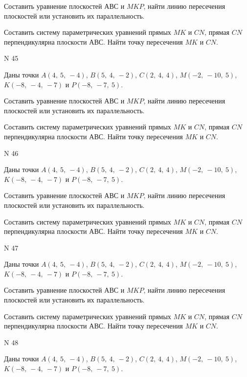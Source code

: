 \documentclass[11pt]{report}
\begin{document}
Составить уравнение плоскостей $АВС$ и $MKP$,
найти линию пересечения плоскостей или установить их параллельность.

Составить систему параметрических уравнений прямых $MK$ и $CN$,
прямая $CN$ перпендикулярна плоскости $АВС$. 
Найти точку пересечения $MK$ и $CN$.



 N 45

Даны точки $A\left( 4, \  5, \  -4\right)$, $B\left( 5, \  4, \  -2\right)$, $C\left( 2, \  4, \  4\right)$, $M\left( -2, \  -10, \  5\right)$, $K\left( -8, \  -4, \  -7\right)$ и $P\left( -8, \  -7, \  5\right)$.


Составить уравнение плоскостей $АВС$ и $MKP$,
найти линию пересечения плоскостей или установить их параллельность.

Составить систему параметрических уравнений прямых $MK$ и $CN$,
прямая $CN$ перпендикулярна плоскости $АВС$. 
Найти точку пересечения $MK$ и $CN$.



 N 46

Даны точки $A\left( 4, \  5, \  -4\right)$, $B\left( 5, \  4, \  -2\right)$, $C\left( 2, \  4, \  4\right)$, $M\left( -2, \  -10, \  5\right)$, $K\left( -8, \  -4, \  -7\right)$ и $P\left( -8, \  -7, \  5\right)$.


Составить уравнение плоскостей $АВС$ и $MKP$,
найти линию пересечения плоскостей или установить их параллельность.

Составить систему параметрических уравнений прямых $MK$ и $CN$,
прямая $CN$ перпендикулярна плоскости $АВС$. 
Найти точку пересечения $MK$ и $CN$.



 N 47

Даны точки $A\left( 4, \  5, \  -4\right)$, $B\left( 5, \  4, \  -2\right)$, $C\left( 2, \  4, \  4\right)$, $M\left( -2, \  -10, \  5\right)$, $K\left( -8, \  -4, \  -7\right)$ и $P\left( -8, \  -7, \  5\right)$.


Составить уравнение плоскостей $АВС$ и $MKP$,
найти линию пересечения плоскостей или установить их параллельность.

Составить систему параметрических уравнений прямых $MK$ и $CN$,
прямая $CN$ перпендикулярна плоскости $АВС$. 
Найти точку пересечения $MK$ и $CN$.



 N 48

Даны точки $A\left( 4, \  5, \  -4\right)$, $B\left( 5, \  4, \  -2\right)$, $C\left( 2, \  4, \  4\right)$, $M\left( -2, \  -10, \  5\right)$, $K\left( -8, \  -4, \  -7\right)$ и $P\left( -8, \  -7, \  5\right)$.
\end{document}
